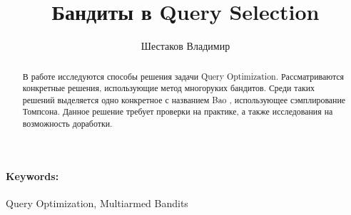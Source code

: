 \documentclass[12pt]{article}
\title{Бандиты в Query Selection}
\author{Шестаков Владимир}
\date{}
\begin{document}
\maketitle

\begin{abstract}
В работе исследуются способы решения задачи Query Optimization. Рассматриваются конкретные решения, использующие метод многоруких бандитов. Среди таких решений выделяется одно конкретное с названием Bao \cite{bao}, использующее сэмплирование Томпсона. Данное решение требует проверки на практике, а также исследования на возможность доработки.
\end{abstract}
\paragraph{Keywords:} Query Optimization, Multiarmed Bandits



\end{document}
